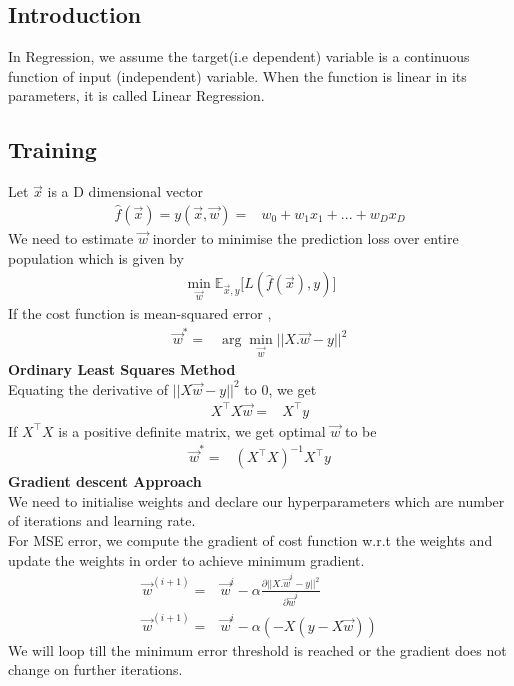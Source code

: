 \documentclass[12pt,letterpaper, onecolumn]{exam}
\begin{document}
 \subsection*{Introduction}
In Regression, we assume the target(i.e dependent) variable is a continuous function of input (independent) variable. When the function is linear in its parameters, it is called Linear Regression.
\subsection*{Training}
Let $\vec{x}$ is a D dimensional vector
\begin{align}
\hat{f}(\vec{x}) = y(\vec{x}, \vec{w}) ={}& w_0 + w_1x_1 + ... + w_Dx_D
\end{align}
We need to estimate $\vec{w}$ inorder to minimise the prediction loss over entire population which is given by
\begin{align}
\min_{\vec{w}}\mathbb{E}_{\vec{x},y}\big[L(\hat{f}(\vec{x}),y)\big]
\end{align}
If the cost function is mean-squared error ,
\begin{align}
\label{der}
\vec{w}^{*} ={}&  \arg \min_{\vec{w}}||X.\vec{w} - y||^2
\end{align}
\textbf{Ordinary Least Squares Method}\\
Equating the derivative of  $||X\vec{w} - y||^2$ to 0, we get
\begin{align}
X^\top X\vec{w} ={}& X^\top y
\end{align}
If $X^\top X$ is a positive definite matrix, we get optimal $\vec{w}$  to be
\begin{align}
\vec{w}^{*} ={}&(X^\top X)^{-1} X^\top y
\end{align}
\textbf{Gradient descent Approach}\\
We need to initialise weights and declare our hyperparameters which are number of iterations and learning rate.\\
For MSE error, we compute the gradient of cost function w.r.t the weights and update the weights in order to achieve minimum gradient.
\begin{align}
\vec{w}^{(i+1)} ={}& \vec{w}^{i} - \alpha\frac{\partial ||X.\vec{w}^i - y||^2}{\partial \vec{w}^i}\\
\vec{w}^{(i+1)} ={}& \vec{w}^{i} - \alpha (-X(y-X\vec{w}))
\end{align}
We will loop till the minimum error threshold is reached or the gradient does not change on further iterations.
\end{document}
